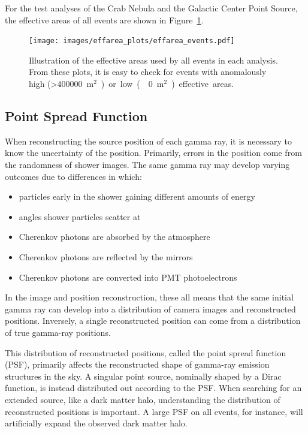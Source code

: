     For the test analyses of the Crab Nebula and the Galactic Center Point Source, the effective areas of all events are shown in Figure~\ref{fig:effarea_usage}.

    \begin{figure}[ht]
      \centering
      \texttt{[image: images/effarea\_plots/effarea\_events.pdf]}
      \caption[Effective Areas Used]{
      Illustration of the effective areas used by all events in each analysis.
      From these plots, it is easy to check for events with anomalously high (>\SI{400000}{m${}^2$}) or low (\nicetilde\SI{0}{m${}^2$}) effective areas.
      }
      \label{fig:effarea_usage}
    \end{figure}
  
  \FloatBarrier

  \subsection{Point Spread Function}\label{subsec:psf}

    When reconstructing the source position of each gamma ray, it is necessary to know the uncertainty of the position.
    Primarily, errors in the position come from the randomness of shower images.
    The same gamma ray may develop varying outcomes due to differences in which:
    \begin{itemize}[label=$\bullet$]
      \item particles early in the shower gaining different amounts of energy
      \item angles shower particles scatter at
      \item Cherenkov photons are absorbed by the atmosphere
      \item Cherenkov photons are reflected by the mirrors
      \item Cherenkov photons are converted into PMT photoelectrons
    \end{itemize}
    In the image and position reconstruction, these all means that the same initial gamma ray can develop into a distribution of camera images and reconstructed positions.
    Inversely, a single reconstructed position can come from a distribution of true gamma-ray positions.

    This distribution of reconstructed positions, called the point spread function (PSF), primarily affects the reconstructed shape of gamma-ray emission structures in the sky.
    A singular point source, nominally shaped by a Dirac function, is instead distributed out according to the PSF.
    When searching for an extended source, like a dark matter halo, understanding the distribution of reconstructed positions is important.
    A large PSF on all events, for instance, will artificially expand the observed dark matter halo.

